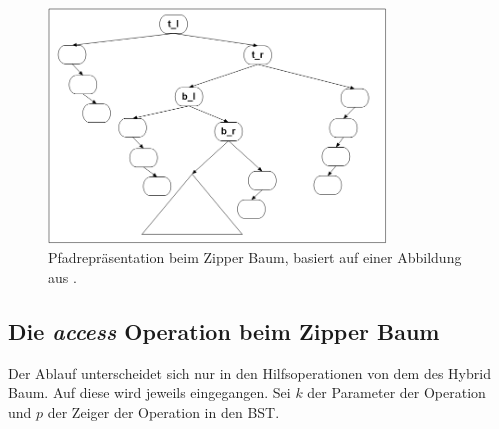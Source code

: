 \documentclass[a4paper,12pt]{article}
\begin{document}
\begin{figure}[h]
	\centering
	\includegraphics[width= 0.8\textwidth]{"Medien/Zipper/zipperPathRep"}
	\caption{Pfadrepräsentation beim Zipper Baum, basiert auf einer Abbildung aus \cite{zipper}. }
	\label{fig:zipperPathRep}
\end{figure}




  
 
 \subsection{Die \textit{access} Operation beim Zipper Baum}
 Der Ablauf unterscheidet sich nur in den Hilfsoperationen von dem des Hybrid Baum. Auf diese wird jeweils eingegangen. 
 Sei $k$ der Parameter der Operation und $p$ der Zeiger der Operation in den BST. 
\end{document}
